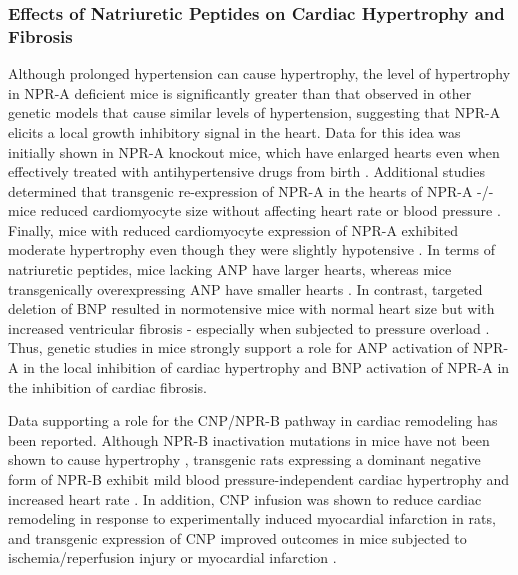 \documentclass[14pt,a4paper,onecolumn]{extarticle}
\begin{document}
\subsubsection{Effects of Natriuretic Peptides on Cardiac Hypertrophy and Fibrosis}

Although prolonged hypertension can cause hypertrophy, the level of hypertrophy in NPR-A deficient mice is significantly greater than that observed in other genetic models that cause similar levels of hypertension, suggesting that NPR-A elicits a local growth inhibitory signal in the heart. Data for this idea was initially shown in NPR-A knockout mice, which have enlarged hearts even when effectively treated with antihypertensive drugs from birth \citep{Knowles2001}. Additional studies determined that transgenic re-expression of NPR-A in the hearts of NPR-A -/- mice reduced cardiomyocyte size without affecting heart rate or blood pressure \citep{Kishimoto2001}.
Finally, mice with reduced cardiomyocyte expression of NPR-A exhibited moderate hypertrophy even though they were slightly hypotensive \citep{Holtwick2003} \citep{Patel2005}. In terms of natriuretic peptides, mice lacking ANP have larger hearts, whereas mice transgenically overexpressing ANP have smaller hearts \citep{Barbee1994} \citep{Steinhelper1990}.
In contrast, targeted deletion of BNP resulted in normotensive mice with normal heart size but with increased ventricular fibrosis - especially when subjected to pressure overload \citep{Tamura2000}. Thus, genetic studies in mice strongly support a role for ANP activation of NPR-A in the local inhibition of cardiac hypertrophy and BNP activation of NPR-A in the inhibition of cardiac fibrosis.

Data supporting a role for the CNP/NPR-B pathway in cardiac remodeling has been reported. Although NPR-B inactivation mutations in mice have not been shown to cause hypertrophy \citep{Tamura2004} \citep{Tsuji2005}, transgenic rats expressing a dominant negative form of NPR-B exhibit mild blood pressure-independent cardiac hypertrophy and increased heart rate \citep{Langenickel2006}.
In addition, CNP infusion was shown to reduce cardiac remodeling in response to experimentally induced myocardial infarction in rats, and transgenic expression of CNP improved outcomes in mice subjected to ischemia/reperfusion injury or myocardial infarction \citep{Wang2007}.
\end{document}
